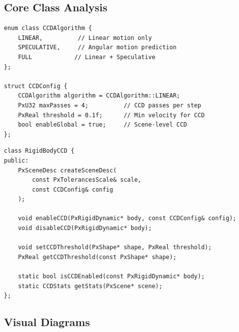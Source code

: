 
\subsection{Core Class Analysis}

\begin{lstlisting}[caption={CCDConfig}]
enum class CCDAlgorithm {
    LINEAR,          // Linear motion only
    SPECULATIVE,     // Angular motion prediction
    FULL            // Linear + Speculative
};

struct CCDConfig {
    CCDAlgorithm algorithm = CCDAlgorithm::LINEAR;
    PxU32 maxPasses = 4;          // CCD passes per step
    PxReal threshold = 0.1f;      // Min velocity for CCD
    bool enableGlobal = true;     // Scene-level CCD
};
\end{lstlisting}

\begin{lstlisting}[caption={RigidBodyCCD methods}]
class RigidBodyCCD {
public:
    PxSceneDesc createSceneDesc(
        const PxTolerancesScale& scale,
        const CCDConfig& config
    );

    void enableCCD(PxRigidDynamic* body, const CCDConfig& config);
    void disableCCD(PxRigidDynamic* body);

    void setCCDThreshold(PxShape* shape, PxReal threshold);
    PxReal getCCDThreshold(const PxShape* shape);

    static bool isCCDEnabled(const PxRigidDynamic* body);
    static CCDStats getStats(PxScene* scene);
};
\end{lstlisting}


\subsection{Visual Diagrams}

